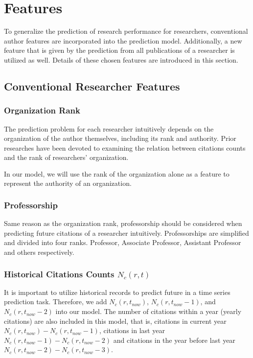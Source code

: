 \section{Features}
To generalize the prediction of research performance for researchers, conventional author features are incorporated into the prediction model.
Additionally, a new feature that is given by the prediction from all publications of a researcher is utilized as well.
Details of these chosen features are introduced in this section.

\subsection{Conventional Researcher Features}
\subsubsection{Organization Rank}
The prediction problem for each researcher intuitively depends on the organization of the author themselves, including its rank and authority.
Prior researches have been devoted to examining the relation between citations counts and the rank of researchers' organization\cite{van2005fatal}.

In our model, we will use the rank of the organization alone as a feature to represent the authority of an organization.

\subsubsection{Professorship}
Same reason as the organization rank, professorship should be considered when predicting future citations of a researcher intuitively. Professorships are simplified and divided into four ranks. Professor, Associate Professor, Assistant Professor and others respectively.

\subsubsection{Historical Citations Counts $N_c(r,t)$}
It is important to utilize historical records to predict future in a time series prediction task\cite{weigend1994time}.
Therefore, we add $N_c(r,t_{now})$, $N_c(r,t_{now}-1)$, and $N_c(r,t_{now}-2)$ into our model.
The number of citations within a year (yearly citations) are also included in this model, that is,
citations in current year
$N_c(r,t_{now})-N_c(r,t_{now}-1)$, citations in last year $N_c(r,t_{now}-1)-N_c(r,t_{now}-2)$ and citations in the year before last year $N_c(r,t_{now}-2)-N_c(r,t_{now}-3)$.

